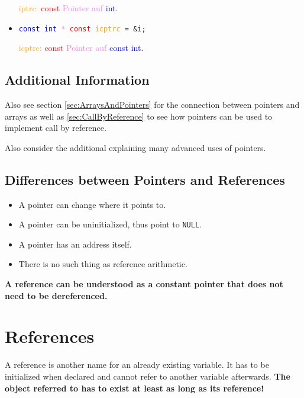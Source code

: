 \documentclass[10pt,a4paper]{scrartcl}
\begin{document}
\begin{multicols*}{2}
\begin{minipage}[t]{0.5\linewidth}
\begin{itemize}
\textcolor{orange}{iptrc:} \textcolor{red}{const} \textcolor{violet}{Pointer auf} \textcolor{blue}{int}.
\item \texttt{\textcolor{blue}{const int} \textcolor{violet}{*} \textcolor{red}{const} \textcolor{orange}{icptrc} = \&i;}

\textcolor{orange}{icptrc:} \textcolor{red}{const} \textcolor{violet}{Pointer auf} \textcolor{blue}{const int}.
\end{itemize}
\end{minipage}


\subsection{Additional Information}

Also see section  \ref{sec:ArraysAndPointers} for the connection between pointers and arrays as well as \ref{sec:CallByReference} to see how pointers can be used to implement call by reference.

Also consider the additional  explaining many advanced uses of pointers.

\subsection{Differences between Pointers and References}

\begin{itemize}
\item A pointer can change where it points to.
\item A pointer can be uninitialized, thus point to \verb+NULL+.
\item A pointer has an address itself.
\item There is no such thing as reference arithmetic.
\end{itemize}

\textbf{A reference can be understood as a constant pointer that does not need to be dereferenced.}

\section{References}

A reference is another name for an already existing variable. It has to be initialized when declared and cannot refer to another variable afterwards. \textbf{The object referred to has to exist at least as long as its reference!}


\end{multicols*}
\end{document}
